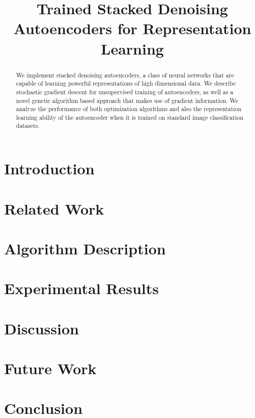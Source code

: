 \documentclass[conference,onecolumn]{IEEEtran}
\begin{document}
\title{Trained Stacked Denoising Autoencoders for Representation Learning}

\author{
\and
{}
}

\maketitle

\begin{abstract}
We implement stacked denoising autoencoders, a class of neural networks that are capable of learning powerful representations of high dimensional data. We describe stochastic gradient descent for unsupervised training of autoencoders, as well as a novel genetic algorithm based approach that makes use of gradient information. We analyze the performance of both optimization algorithms and also the representation learning ability of the autoencoder when it is trained on standard image classification datasets. 
\end{abstract}

\FloatBarrier
\section{Introduction}

\FloatBarrier
\section{Related Work}

\FloatBarrier
\section{Algorithm Description}

\FloatBarrier

\section{Experimental Results}

\FloatBarrier
\section{Discussion}
% 

\FloatBarrier
\section{Future Work}

\FloatBarrier
\section{Conclusion}

\FloatBarrier



\end{document}
